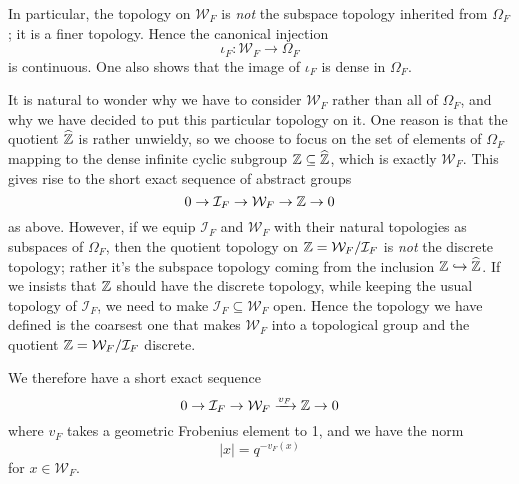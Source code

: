 In particular, the topology on $\mathcal{W}_F$ is \emph{not} the subspace topology inherited from $\Omega_F$; it is a finer topology. Hence the canonical injection
\[\iota_F: \mathcal{W}_F\to \Omega_F\]
is continuous. One also shows that the image of $\iota_F$ is dense in $\Omega_F$.
\begin{rem}
	It is natural to wonder why we have to consider $\mathcal{W}_F$ rather than all of $\Omega_F$, and why we have decided to put this particular topology on it. One reason is that the quotient $\widehat{\mathbb{Z}}$ is rather unwieldy, so we choose to focus on the set of elements of $\Omega_F$ mapping to the dense infinite cyclic subgroup $\mathbb{Z}\subseteq \widehat{\mathbb{Z}}$, which is exactly $\mathcal{W}_F$. This gives rise to the short exact sequence of abstract groups
	\[0\to \mathcal{I}_F\to \mathcal{W}_F\to \mathbb{Z}\to 0\]
	as above. However, if we equip $\mathcal{I}_F$ and $\mathcal{W}_F$ with their natural topologies as subspaces of $\Omega_F$, then the quotient topology on $\mathbb{Z} = \mathcal{W}_F/\mathcal{I}_F$ is \emph{not} the discrete topology; rather it's the subspace topology coming from the inclusion $\mathbb{Z}\hookrightarrow \widehat{\mathbb{Z}}$. If we insists that $\mathbb{Z}$ should have the discrete topology, while keeping the usual topology of $\mathcal{I}_F$, we need to make $\mathcal{I}_F\subseteq \mathcal{W}_F$ open. Hence the topology we have defined is the coarsest one that makes $\mathcal{W}_F$ into a topological group and the quotient $\mathbb{Z} = \mathcal{W}_F/\mathcal{I}_F$ discrete.
\end{rem}

 We therefore have a short exact sequence
\[0 \to \mathcal{I}_F \to \mathcal{W}_F \xrightarrow{v_F} \mathbb{Z}\to 0\]
where $v_F$ takes a geometric Frobenius element to 1, and we have the norm
\[|x| = q^{-v_F(x)}\]
for $x\in \mathcal{W}_F$.

